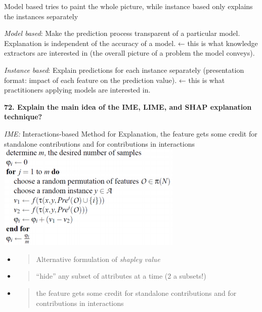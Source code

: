 Model based tries to paint the whole picture, while instance based only
explains the instances separately

\textit{Model based}: Make the prediction process transparent of a
particular model. Explanation is independent of the accuracy of a model.
← this is what knowledge extractors are interested in (the overall
picture of a problem the model conveys).

\textit{Instance based}: Explain predictions for each instance
separately (presentation format: impact of each feature on the
prediction value). ← this is what practitioners applying models are
interested in.

\textbf{72. Explain the main idea of the IME, LIME, and SHAP explanation
technique?}

\textit{IME:} Interactions-based Method for Explanation, the feature
gets some credit for standalone contributions and for contributions in
interactions\includegraphics[width=3.46576in,height=1.98044in]{media/image21.png}

\begin{itemize}
\item
  \begin{quote}
  Alternative formulation of \emph{shapley value}
  \end{quote}
\end{itemize}

\begin{itemize}
\item
  \begin{quote}
  ``hide'' any subset of attributes at a time (2 a subsets!)
  \end{quote}
\end{itemize}

\begin{itemize}
\item
  \begin{quote}
  the feature gets some credit for standalone contributions and for
  contributions in interactions
  \end{quote}
\end{itemize}

